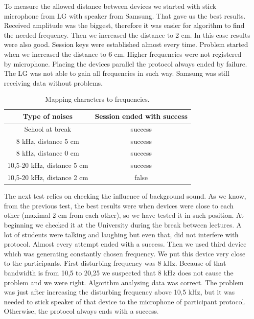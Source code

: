 \documentclass[11pt,titlepage]{article}
\theoremstyle{plain}
\begin{document}
To measure the allowed distance between devices we started with stick microphone from LG with speaker from Samsung. That gave us the best results. Received amplitude was the biggest, therefore it was easier for algorithm to find the needed frequency. Then we increased the distance to 2 cm. In this case results were also good. Session keys were established almost every time. Problem started when we increased the distance to 6 cm. Higher frequencies were not registered by microphone. Placing the devices parallel the protocol always ended by failure. The LG was not able to gain all frequencies in such way. Samsung was still receiving data without problems. 

\vspace{5mm}

	\begin{table}[H]
		\centering
		\begin{tabular}{| c | c |}
			\hline
			Type of noises & Session ended with success \\
			\hline
			School at break & success \\
			\hline
			8 kHz, distance 5 cm & success \\
			\hline
			8 kHz, distance 0 cm & success \\
			\hline
			10,5-20 kHz, distance 5 cm & success \\
			\hline
			10,5-20 kHz, distance 2 cm & false \\
			\hline
		\end{tabular}
		\caption{Mapping characters to frequencies.}
	\end{table}

The next test relies on checking the influence of background sound. As we know, from the previous test, the best results were when devices were close to each other (maximal 2 cm from each other), so we have tested it in such position. At beginning we checked it at the University during the break between lectures. A lot of students were talking and laughing but even that, did not interfere with protocol. Almost every attempt ended with a success. Then we used third device which was generating constantly chosen frequency. We put this device very close to the participants. First disturbing frequency was 8 kHz. Because of that bandwidth is from 10,5 to 20,25 we suspected that 8 kHz does not cause the problem and we were right. Algorithm analysing data was correct. The problem was just after increasing the disturbing frequency above 10,5 kHz, but it was needed to stick speaker of that device to the microphone of participant protocol. Otherwise, the protocol always ends with a success. 
\end{document}
